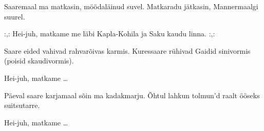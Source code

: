 Saaremaal ma matkasin,
m\"o\"odal\"ainud suvel.
Matkaradu j\"atkasin,
Mannermaalgi suurel.

:,: Hei-juh, matkame
    me l\"abi Kapla-Kohila
    ja Saku kaudu linna. :,: 

Saare eided vahivad
rahvar\~oivas karmis.
Kuressaare r\"uhivad
Gaidid sinivormis (poisid skaudivormis).

Hei-juh, matkame \ldots

P\"aeval saare karjamaal
s\~oin ma kadakmarju.
\~Ohtul lahkun tolmun'd raalt
\"o\"oseks suitsutarre.

Hei-juh, matkame \ldots